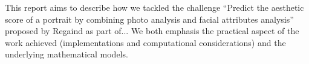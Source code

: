     This report aims to describe how we tackled the challenge ``Predict the aesthetic score of a portrait by combining photo analysis and facial attributes analysis'' proposed by Regaind as part of... We both emphasis the practical aspect of the work achieved (implementations and computational considerations) and the underlying mathematical models.
    